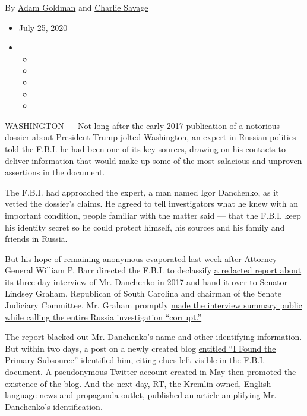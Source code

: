By \href{https://www.nytimes.com/by/adam-goldman}{Adam Goldman} and
\href{https://www.nytimes.com/by/charlie-savage}{Charlie Savage}

\begin{itemize}
\item
  July 25, 2020
\item
  \begin{itemize}
  \item
  \item
  \item
  \item
  \item
  \end{itemize}
\end{itemize}

WASHINGTON --- Not long after
\href{https://www.nytimes.com/2017/01/11/us/politics/donald-trump-russia-intelligence.html}{the
early 2017 publication of a notorious dossier about President Trump}
jolted Washington, an expert in Russian politics told the F.B.I. he had
been one of its key sources, drawing on his contacts to deliver
information that would make up some of the most salacious and unproven
assertions in the document.

The F.B.I. had approached the expert, a man named Igor Danchenko, as it
vetted the dossier's claims. He agreed to tell investigators what he
knew with an important condition, people familiar with the matter said
--- that the F.B.I. keep his identity secret so he could protect
himself, his sources and his family and friends in Russia.

But his hope of remaining anonymous evaporated last week after Attorney
General William P. Barr directed the F.B.I. to declassify
\href{https://www.judiciary.senate.gov/imo/media/doc/February\%209,\%202017\%20Electronic\%20Communication.pdf}{a
redacted report about its three-day interview of Mr. Danchenko in 2017}
and hand it over to Senator Lindsey Graham, Republican of South Carolina
and chairman of the Senate Judiciary Committee. Mr. Graham promptly
\href{https://www.judiciary.senate.gov/press/rep/releases/judiciary-committee-releases-declassified-documents-that-substantially-undercut-steele-dossier-page-fisa-warrants}{made
the interview summary public while calling the entire Russia
investigation ``corrupt.''}

The report blacked out Mr. Danchenko's name and other identifying
information. But within two days, a post on a newly created blog
\href{https://ifoundthepss.blogspot.com/}{entitled ``I Found the Primary
Subsource''} identified him, citing clues left visible in the F.B.I.
document. A \href{https://twitter.com/Hmmm57474203}{pseudonymous Twitter
account} created in May then promoted the existence of the blog. And the
next day, RT, the Kremlin-owned, English-language news and propaganda
outlet,
\href{https://www.rt.com/usa/495342-russiagate-steele-dossier-source/}{published
an article amplifying Mr. Danchenko's identification}.

